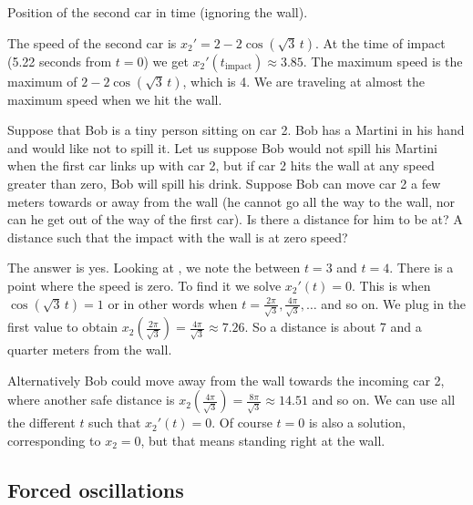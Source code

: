\begin{example}
\begin{mywrapfig}{3.25in}
\capstart
{}
\caption{Position of the second car in time (ignoring the wall).\label{sosa:railcarfig}}
\end{mywrapfig}


The speed of the second car is $x_2' = 2 - 2 \cos ( \sqrt{3} \, t)$.
At the time of impact (5.22 seconds from $t=0$) we get 
$x_2'(t_{\text{impact}}) \approx 3.85$.
%
The maximum speed is the maximum of $2 - 2 \cos ( \sqrt{3} \, t )$, which is 4.
We are traveling at almost the maximum speed when we hit the wall.

\medskip

Suppose that Bob is a tiny person sitting on car 2.  Bob has a Martini in
his hand and would like not to spill it.  Let us suppose Bob would not spill
his Martini
when the first car links up with car 2, but if car 2 hits the wall at any
speed greater than zero, Bob will spill his drink.  Suppose Bob
can move car 2
a few meters towards or away from the wall (he cannot go all the way to the
wall, nor can he get out of the way of the first car).  Is there a
distance for him to be at?  A distance such that the impact with
the wall is at zero speed?

The answer is yes.  Looking at ,
we note the  between $t=3$ and $t=4$.  There is a point where
the speed is zero.  To find it we solve $x_2'(t) = 0$.  This is when
$\cos ( \sqrt{3} \, t) = 1$ or in other words when $t = \frac{2 \pi}{\sqrt{3}}, 
\frac{4 \pi}{\sqrt{3}},\ldots$ and so on.  We plug in the first value to obtain
$x_2\left(\frac{2 \pi}{\sqrt{3}}\right) = 
\frac{4 \pi}{\sqrt{3}} \approx 7.26$.  So a  distance is about 7 and a
quarter meters from the wall.

Alternatively Bob could move away from the wall
towards the incoming car 2, where another safe distance is
$x_2 \left( \frac{4 \pi}{\sqrt{3}} \right) = \frac{8 \pi}{\sqrt{3}}
\approx 14.51$ and so on.  We can use all the different
$t$ such that $x_2'(t) = 0$.  Of course $t=0$ is also a solution,
corresponding to $x_2 = 0$, but
that means standing right at the wall.
\end{example}

\subsection{Forced oscillations}

